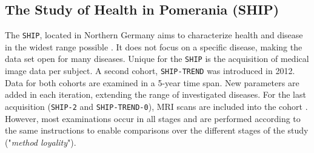 \documentclass[journal]{style/vgtc} 			          %
\begin{document}
\subsection{The Study of Health in Pomerania (SHIP)}
The \texttt{SHIP}, located in Northern Germany aims to characterize health and disease in the widest range possible \cite{Volzke2011}.
It does not focus on a specific disease, making the data set open for many diseases.
Unique for the \texttt{SHIP} is the acquisition of medical image data per subject.
A second cohort, \texttt{SHIP-TREND} was introduced in 2012.
Data for both cohorts are examined in a 5-year time span.
New parameters are added in each iteration, extending the range of investigated diseases.
For the last acquisition (\texttt{SHIP-2} and \texttt{SHIP-TREND-0}), MRI scans are included into the cohort \cite{Hegenscheid2009, Ivanovska2014}.
However, most examinations occur in all stages and are performed according to the same instructions to enable comparisons over the different stages of the study ("\emph{method loyality}").
%
%
%
%
%
%
\end{document}
